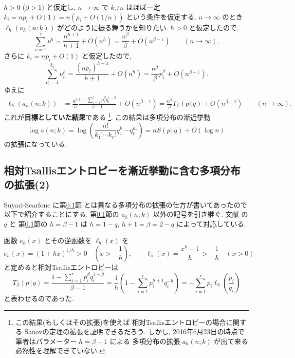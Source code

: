 \documentclass[12pt,twoside]{jarticle}
\theoremstyle{jplain}
\theoremstyle{jplain}
\theoremstyle{jplain}
\numberwithin{theorem}{section}
\numberwithin{equation}{section}
\numberwithin{figure}{section}
\numberwithin{table}{section}
\newcommand\secref[1]{第\ref{#1}節}
\begin{document}
$h>0$ ($\beta>1$) と仮定し, 
$n\to\infty$ で $k_i/n$ はほぼ一定 $k_i=n p_i + O(1)=n(p_i+O(1/n))$ という条件を仮定する.
$n\to\infty$ のとき $\ell_h(a_h(n;k))$ がどのように振る舞うかを知りたい.
$h>0$ と仮定したので, 
\[
\sum_{\nu=1}^r \nu^h 
= \frac{n^{h+1}}{h+1} + O(n^h)
= \frac{n^\beta}{\beta} + O(n^{\beta-1})
\qquad (n\to\infty).
\]
さらに $k_i=np_i+O(1)$ と仮定したので, 
\[
\sum_{\nu_i=1}^{k_i}\nu_i^h 
= \frac{(np_i)^{h+1}}{h+1} + O(n^h)
= \frac{n^\beta}{\beta}p_i^\beta+ O(n^{\beta-1}).
\]
ゆえに
\begin{align*}
\ell_h(a_h(n;k))
&
=\frac{n^\beta}{\beta}\frac{1-\sum_{i=1}^r p_i^\beta q_i^{1-\beta}}{\beta-1}
+ O(n^{\beta-1})
=\frac{n^\beta}{\beta} T_\beta(p||q) + O(n^{\beta-1})
\qquad(n\to\infty).
\end{align*}
これが{\bf 目標としていた結果}である%
\footnote{この結果(もしくはその拡張)を使えば
相対Tsallisエントロピーの場合に関する
Sanovの定理の拡張を証明できるだろう.
しかし, 2016年6月23日の時点で筆者はパラメーター $h=\beta-1$ による
多項分布の拡張 $a_h(n;k)$ が出て来る必然性を理解できていない.}. 
この結果は多項分布の漸近挙動
\[
\log a(n;k)
= \log\left( \frac{n!}{k_1!\cdots k_r!}q_1^{k_1}\cdots q_r^{k_r} \right)
= n S(p||q) + O(\log n)
\]
の拡張になっている.



\subsection{相対Tsallisエントロピーを漸近挙動に含む多項分布の拡張(2)}
\label{sec:Tsallis-multinomial-2}

Suyari-Scarfone \cite{Sutari-Scarfone} に\secref{sec:Tsallis-multinomial-2}
とは異なる多項分布の拡張の仕方が書いてあったので以下で紹介することにする.
\secref{sec:Tsallis-multinomial-2}の $a_h(n;k)$ 以外の記号を引き継ぐ. 
文献 \cite{Sutari-Scarfone} の $q$ と
\secref{sec:Tsallis-multinomial-2}の $h=\beta-1$ は $h=1-q$, $h+1=\beta=2-q$
によって対応している.

函数 $e_h(x)$ とその逆函数を $\ell_h(x)$ を
\[
e_h(x)=(1+hx)^{1/h}>0 \quad \left(x>-\frac{1}{h}\right), \qquad 
\ell_h(x)=\frac{x^h-1}{h}>-\frac{1}{h} \quad (x>0)
\]
と定めると相対Tsallisエントロピーは
\[
T_\beta(p||q)
= \frac{1-\sum_{i=1}^r p_i^\beta q_i^{1-\beta}}{\beta-1}
= \frac{1}{h}\left(1-\sum_{i=1}^r p_i^{h+1}q_i^{-h}\right) 
= - \sum_{i=1}^r p_i\ell_h\left(\frac{p_i}{q_i}\right)
\]
と表わせるのであった.
\end{document}
